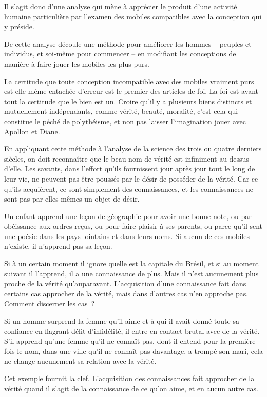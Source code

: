 \documentclass[french,twoside]{book} %
\begin{document}
Il s'agit donc d'une analyse qui mène à apprécier le produit d'une activité humaine particulière par l'examen des mobiles compatibles avec la conception qui y préside.\par
De cette analyse découle une méthode pour améliorer les hommes – peuples et individus, et soi-même pour commencer – en modifiant les conceptions de manière à faire jouer les mobiles les plus purs.\par
La certitude que toute conception incompatible avec des mobiles vraiment purs est elle-même entachée d'erreur est le premier des articles de foi. La foi est avant tout la certitude que le bien est un. Croire qu'il y a plusieurs biens distincts et mutuellement indépendants, comme vérité, beauté, moralité, c'est cela qui constitue le péché de polythéisme, et non pas laisser l'imagination jouer avec Apollon et Diane.\par
En appliquant cette méthode à l'analyse de la science des trois ou quatre derniers siècles, on doit reconnaître que le beau nom de vérité est infiniment au-dessus d'elle. Les savants, dans l'effort qu'ils fournissent jour après jour tout le long de leur vie, ne peuvent pas être poussés par le désir de posséder de la vérité. Car ce qu'ils acquièrent, ce sont simplement des connaissances, et les connaissances ne sont pas par elles-mêmes un objet de désir.\par
Un enfant apprend une leçon de géographie pour avoir une bonne note, ou par obéissance aux ordres reçus, ou pour faire plaisir à ses parents, ou parce qu'il sent une poésie dans les pays lointains et dans leurs noms. Si aucun de ces mobiles n'existe, il n'apprend pas sa leçon.\par
Si à un certain moment il ignore quelle est la capitale du Brésil, et si au moment suivant il l'apprend, il a une connaissance de plus. Mais il n'est aucunement plus proche de la vérité qu'auparavant. L'acquisition d'une connaissance fait dans certains cas approcher de la vérité, mais dans d'autres cas n'en approche pas. Comment discerner les cas ?\par
Si un homme surprend la femme qu'il aime et à qui il avait donné toute sa confiance en flagrant délit d'infidélité, il entre en contact brutal avec de la vérité. S'il apprend qu'une femme qu'il ne connaît pas, dont il entend pour la première fois le nom, dans une ville qu'il ne connaît pas davantage, a trompé son mari, cela ne change aucunement sa relation avec la vérité.\par
\par
Cet exemple fournit la clef. L'acquisition des connaissances fait approcher de la vérité quand il s'agit de la connaissance de ce qu'on aime, et en aucun autre cas.\par
\end{document}
